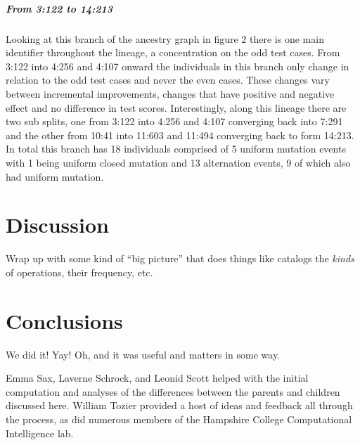 \subparagraph{From 3:122 to 14:213}
Looking at this branch of the ancestry graph in figure 2 there is one main identifier
throughout the lineage, a concentration on the odd test cases. From 3:122 into 4:256 and 4:107
onward the individuals in this branch only change in relation to the odd test cases and never
the even cases. These changes vary between incremental improvements, changes that have positive
and negative effect and no difference in test scores. Interestingly, along this lineage there are
two sub splits, one from 3:122 into 4:256 and 4:107 converging back into 7:291 and the other from
10:41 into 11:603 and 11:494 converging back to form 14:213. In total this branch has 18 
individuals comprised of 5 uniform mutation events with 1 being uniform closed mutation and 
13 alternation events, 9 of which also had uniform mutation.

\section{Discussion}
\label{sec:discussion}

Wrap up with some kind of ``big picture'' that does things like catalogs the
\emph{kinds} of operations, their frequency, etc.







\section{Conclusions}
\label{sec:conclusions}

We did it! Yay! Oh, and it was useful and matters in some way.

\begin{acknowledgement}
	Emma Sax, Laverne Schrock, and Leonid Scott helped 
	with the initial computation and analyses of the differences between the 
	parents and children discussed here. William Tozier provided a host of 
	ideas and feedback all through the process, as did numerous members
	of the Hampshire College Computational Intelligence lab.
\end{acknowledgement}



